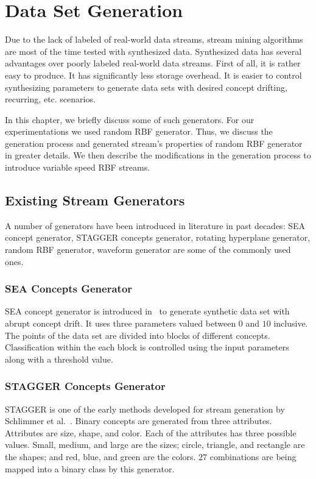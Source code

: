 \chapter{Data Set Generation}
\label{chp:dataset}
Due to the lack of labeled of real-world data streams, stream mining algorithms are most of the time tested with synthesized data. Synthesized data has several advantages over poorly labeled real-world data streams. First of all, it is rather easy to produce. It has significantly less storage overhead. It is easier to control synthesizing parameters to generate data sets with desired concept drifting, recurring, etc. scenarios.

In this chapter, we briefly discuss some of such generators. For our experimentations we used random RBF generator. Thus, we  discuss the generation process and generated stream's properties of random RBF generator in greater details. We then describe the modifications in the generation process to introduce variable speed RBF streams.

\section{Existing Stream Generators}
A number of generators have been introduced in literature in past decades: SEA concept generator, STAGGER concepts generator, rotating hyperplane generator, random RBF generator, waveform generator are some of the commonly used ones. 

\subsection*{SEA Concepts Generator}
SEA concept generator is introduced in~\cite{street01:sea} to generate synthetic data set with abrupt concept drift. It uses three parameters valued between $0$ and $10$ inclusive. The points of the data set are divided into blocks of different concepts. Classification within the each block is controlled using the input parameters along with a threshold value.

\subsection*{STAGGER Concepts Generator}
STAGGER is one of the early methods developed for stream generation by Schlimmer et al.~\cite{schlimmer86:stagger}. Binary concepts are generated from three attributes. Attributes are size, shape, and color. Each of the attributes has three possible values. Small, medium, and large are the sizes; circle, triangle, and rectangle are the shapes; and red, blue, and green are the colors. $27$ combinations are being mapped into a binary class by this generator.

